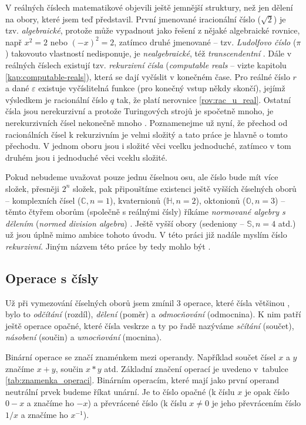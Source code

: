 V reálných číslech matematikové objevili ještě jemnější struktury, než jen dělení na obory, které jsem teď představil. První jmenované iracionální číslo ($\sqrt{2}$) je tzv. \textit{algebraické}, protože může vypadnout jako řešení z nějaké algebraické rovnice, např $x ^ 2 = 2$ nebo $(-x) ^ 2 = 2$, zatímco druhé jmenované -- tzv. \textit{Ludolfovo číslo} ($\pi$) takovouto vlastností nedisponuje, je \textit{nealgebraické}, též \textit{transcendentní} \cite{TeMno}. Dále v reálných číslech existují tzv. \textit{rekurzivní čísla} (\textit{computable reals} -- vizte kapitolu \ref{kap:computable-reals}), která se dají vyčíslit v konečném čase. Pro reálné číslo $r$ a dané $\varepsilon$ existuje vyčíslitelná funkce (pro konečný vstup někdy skončí), jejímž výsledkem je racionální číslo $q$ tak, že platí nerovnice \ref{rov:rac_u_real}. Ostatní čísla jsou nerekurzivní a protože Turingových strojů je spočetně mnoho, je nerekurzivních čísel nekonečně mnoho \cite{wiki:CompN}. Poznamenejme už nyní, že přechod od racionálních čísel k rekurzivním je velmi složitý a tato práce je hlavně o tomto přechodu. V jednom oboru jsou i složité věci vcelku jednoduché, zatímco v tom druhém jsou i jednoduché věci vceklu složité.

Pokud nebudeme uvažovat pouze jednu číselnou osu, ale číslo bude mít více složek, přesněji $2^n$ složek, pak připouštíme existenci ještě vyšších číselných oborů -- komplexních čísel ($\mathbb{C}, n = 1$), kvaternionů ($\mathbb{H}, n = 2$), oktonionů ($\mathbb{O}, n = 3$) -- těmto čtyřem oborům (společně s reálnými čísly) říkáme \textit{normované algebry s dělením} (\textit{normed division algebra}) \cite{DAaQT}. Ještě vyšší obory (sedeniony -- $\mathbb{S}, n = 4$ atd.) už jsou úplně mimo ambice tohoto úvodu. V této práci již nadále  myslím číslo \textit{rekurzivní}. Jiným názvem této práce by tedy mohlo být .

\subsection{Operace s čísly}
\label{operace_s_cisly}
Už při vymezování číselných oborů jsem zmínil 3 operace, které čísla většinou , bylo to \textit{odčítání} (rozdíl), \textit{dělení} (poměr) a \textit{odmocňování} (odmocnina). K nim patří ještě operace opačné, které čísla veskrze  a ty po řadě nazýváme \textit{sčítání} (součet), \textit{násobení} (součin) a \textit{umocňování} (mocnina).

Binární operace se značí znaménkem mezi operandy. Například součet čísel $x$ a $y$ značíme $x+y$, součin $x*y$ atd. Základní značení operací je uvedeno v~tabulce \ref{tab:znamenka_operaci}. Binárním operacím, které mají jako první operand neutrální prvek budeme říkat unární. Je to číslo opačné (k číslu $x$ je opak číslo $0-x$ a značíme ho $-x$) a převrácené číslo (k číslu $x\neq0$ je jeho převrácením číslo $1/x$ a značíme ho $x^{-1}$).


